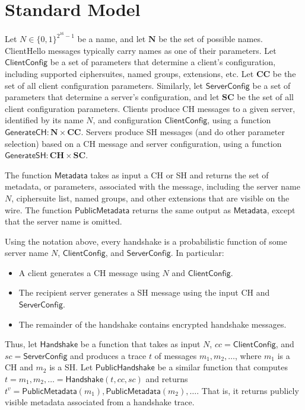 \documentclass{article}
\theoremstyle{definition}
\begin{document}
\section{Standard Model}

Let $N \in \{0,1\}^{2^{16} - 1}$ be a name, and let $\mathbf{N}$ be the set of possible 
names. ClientHello messages typically carry names as one of their parameters.
Let $\mathsf{ClientConfig}$ be a set of parameters that determine a client's configuration,
including supported ciphersuites, named groups, extensions, etc. 
Let $\mathbf{CC}$ be the set of all client configuration parameters.
Similarly, let $\mathsf{ServerConfig}$ be a set of parameters that determine a server's configuration,
and let $\mathbf{SC}$ be the set of all client configuration parameters.
Clients produce CH messages to a given server, identified by its name $N$, and configuration
$\mathsf{ClientConfig}$, using a function $\mathsf{GenerateCH}: \mathbf{N} \times \mathbf{CC}$.
Servers produce SH messages (and do other parameter selection) based on a CH message and 
server configuration, using a function $\mathsf{GenerateSH}: \mathbf{CH} \times \mathbf{SC}$.

The function $\mathsf{Metadata}$ takes as input a CH or SH and returns the set of metadata,
or parameters, associated with the message, including the server name $N$, ciphersuite list,
named groups, and other extensions that are visible on the wire. The function
$\mathsf{PublicMetadata}$ returns the same output as $\mathsf{Metadata}$, except that
the server name is omitted.

Using the notation above, every handshake is a probabilistic function of some server name $N$,
$\mathsf{ClientConfig}$, and $\mathsf{ServerConfig}$. In particular:
%
\begin{itemize}
    \item A client generates a CH message using $N$ and $\mathsf{ClientConfig}$.
    \item The recipient server generates a SH message using the input CH and $\mathsf{ServerConfig}$.
    \item The remainder of the handshake contains encrypted handshake messages.
\end{itemize}
%
Thus, let $\mathsf{Handshake}$ be a function that takes as input $N$,
$cc = \mathsf{ClientConfig}$, and $sc = \mathsf{ServerConfig}$ and produces 
a trace $t$ of messages $m_1, m_2, \dots$, where $m_1$ is a CH and $m_2$ is a SH.
Let $\mathsf{PublicHandshake}$ be a similar function that computes 
$t = m_1, m_2, \dots = \mathsf{Handshake}(t, cc, sc)$ 
and returns $t^v = \mathsf{PublicMetadata}(m_1), \mathsf{PublicMetadata}(m_2), \dots$. 
That is, it returns publicly visible metadata associated from a handshake trace. 
\end{document}
